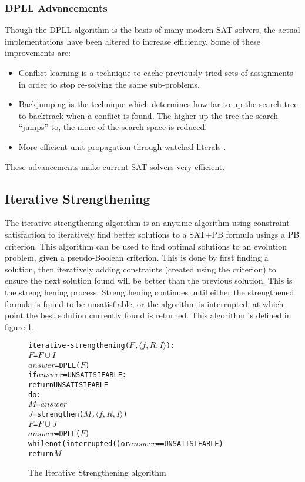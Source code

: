 \subsubsection{DPLL Advancements}
Though the DPLL algorithm is the basis of many modern SAT solvers, the actual implementations have been altered to increase efficiency.
Some of these improvements are:
\begin{itemize}
  \item Conflict learning \citep{stallman1976,sorensson2009} is a technique to cache previously tried sets of assignments in order to stop re-solving the same sub-problems.
	\item Backjumping \citep{Gaschnig1979} is the technique which determines how far to up the search tree to backtrack when a conflict is found.
The higher up the tree the search ``jumps'' to, the more of the search space is reduced.
\item  More efficient unit-propagation through watched literals \citep{Madigan2001,Moskewicz2001}.
\end{itemize}
These advancements make current SAT solvers very efficient.

\subsection{Iterative Strengthening}
The iterative strengthening algorithm  \citep{calistri1994iterative, le2010sat4j} 
is an anytime algorithm using constraint satisfaction to iteratively find better solutions to a SAT+PB formula usings a PB criterion.
This algorithm can be used to find optimal solutions to an evolution problem, given a pseudo-Boolean criterion.
This is done by first finding a solution, then iteratively adding constraints (created using the criterion) to ensure the next solution found will be better than the previous solution.
This is the strengthening process.
Strengthening continues until either the strengthened formula is found to be unsatisfiable, or the algorithm is interrupted, at which point the best solution currently found is returned. 
This algorithm is defined in figure \ref{impl.strength}.

\begin{figure}[htp]
\begin{center}
\begin{alltt}
iterative-strengthening(\(F\),\(\langle f, R, I \rangle\)):
    \(F\) = \(F \cup I\)
    \(answer\) = DPLL(\(F\))
    if \(answer\) = UNSATISIFABLE:
        return UNSATISIFABLE
    do:
        \(M\) = \(answer\)
        \(J\) = strengthen(\(M\),\(\langle f, R, I \rangle\))
        \(F\) = \(F \cup J\)
        \(answer\) = DPLL(\(F\))
    while not (interrupted() or  \(answer\) == UNSATISIFABLE)
    return \(M\) 
\end{alltt}
  \caption{The Iterative Strengthening algorithm}
  \label{impl.strength}
\end{center}
\end{figure}

